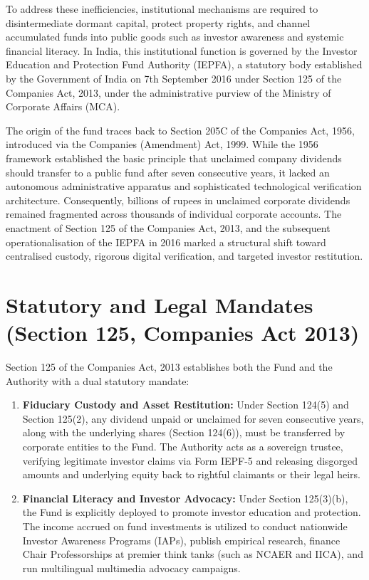 \documentclass[openany]{book}
\begin{document}
To address these inefficiencies, institutional mechanisms are required to disintermediate dormant capital, protect property rights, and channel accumulated funds into public goods such as investor awareness and systemic financial literacy. In India, this institutional function is governed by the Investor Education and Protection Fund Authority (IEPFA), a statutory body established by the Government of India on 7th September 2016 under Section 125 of the Companies Act, 2013, under the administrative purview of the Ministry of Corporate Affairs (MCA).

The origin of the fund traces back to Section 205C of the Companies Act, 1956, introduced via the Companies (Amendment) Act, 1999. While the 1956 framework established the basic principle that unclaimed company dividends should transfer to a public fund after seven consecutive years, it lacked an autonomous administrative apparatus and sophisticated technological verification architecture. Consequently, billions of rupees in unclaimed corporate dividends remained fragmented across thousands of individual corporate accounts. The enactment of Section 125 of the Companies Act, 2013, and the subsequent operationalisation of the IEPFA in 2016 marked a structural shift toward centralised custody, rigorous digital verification, and targeted investor restitution.

\section{Statutory and Legal Mandates (Section 125, Companies Act 2013)}
Section 125 of the Companies Act, 2013 establishes both the Fund and the Authority with a dual statutory mandate:
\begin{enumerate}
    \item \textbf{Fiduciary Custody and Asset Restitution:} Under Section 124(5) and Section 125(2), any dividend unpaid or unclaimed for seven consecutive years, along with the underlying shares (Section 124(6)), must be transferred by corporate entities to the Fund. The Authority acts as a sovereign trustee, verifying legitimate investor claims via Form IEPF-5 and releasing disgorged amounts and underlying equity back to rightful claimants or their legal heirs.
    \item \textbf{Financial Literacy and Investor Advocacy:} Under Section 125(3)(b), the Fund is explicitly deployed to promote investor education and protection. The income accrued on fund investments is utilized to conduct nationwide Investor Awareness Programs (IAPs), publish empirical research, finance Chair Professorships at premier think tanks (such as NCAER and IICA), and run multilingual multimedia advocacy campaigns.
\end{enumerate}
\end{document}
